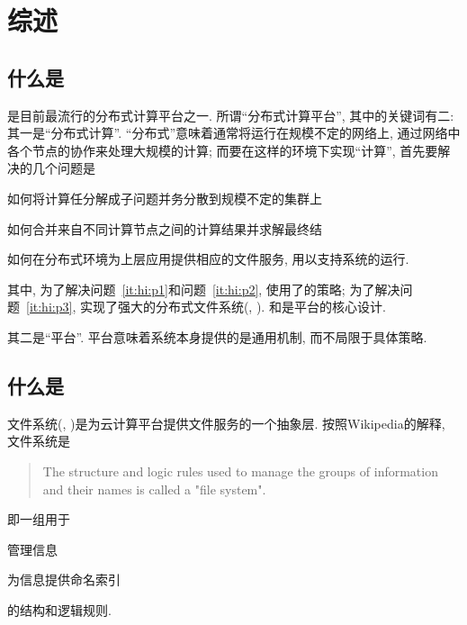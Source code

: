 %
\chapter{\HadoopFS 综述}
\label{ch:hfs-intro}


\section{什么是\Hadoop}
\label{ch:hfs-intro:hadoop}

\Hadoop 是目前最流行的分布式计算平台之一.
所谓``分布式计算平台'', 其中的关键词有二:
其一是``分布式计算''. ``分布式''意味着\Hadoop 通常将运行在规模不定的网络上,
通过网络中各个节点的协作来处理大规模的计算; 而要在这样的环境下实现``计算'',
首先要解决的几个问题是
\begin{XeEnum}
    \item\label{it:hi:p1} 如何将计算任分解成子问题并务分散到规模不定的集群上
    \item\label{it:hi:p2} 如何合并来自不同计算节点之间的计算结果并求解最终结
    \item\label{it:hi:p3} 如何在分布式环境为上层应用提供相应的文件服务, 用以支持\Hadoop 系统的运行.
\end{XeEnum}
其中, 为了解决问题~\ref{it:hi:p1}和问题~\ref{it:hi:p2},
\Hadoop 使用了\MapReduce 的策略;
为了解决问题~\ref{it:hi:p3}, \Hadoop 实现了强大的\Hadoop 分布式文件系统(\HadoopDFS, \HDFS).
\MapReduce 和\HDFS 是\Hadoop 平台的核心设计.

其二是``平台''. 平台意味着\Hadoop 系统本身提供的是通用机制, 而不局限于具体策略.

\section{什么是\HadoopFS}
\label{ch:hfs-intro:hfs}

\Hadoop 文件系统(\HadoopFS, \HFS)是为\Hadoop 云计算平台提供文件服务的一个抽象层.
按照Wikipedia的解释, 文件系统是
\begin{quote}
The structure and logic rules used to manage the groups of information and their names is called a "file system".
\end{quote}
即一组用于
\begin{XeEnum}
    \item 管理信息
    \item 为信息提供命名索引
\end{XeEnum}
的结构和逻辑规则.

